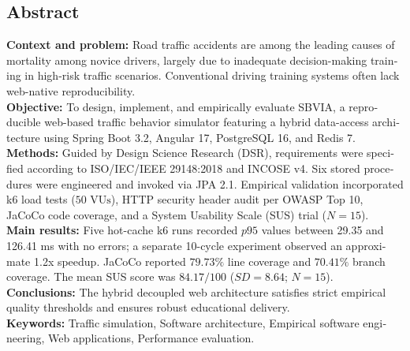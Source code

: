 \documentclass[11pt,a4paper]{report}
\begin{document}
\vspace{1cm}
\begin{otherlanguage}{english}
\chapter*{Abstract}
\textbf{Context and problem:} Road traffic accidents are among the leading causes of mortality among novice drivers, largely due to inadequate decision-making training in high-risk traffic scenarios. Conventional driving training systems often lack web-native reproducibility. \\
\textbf{Objective:} To design, implement, and empirically evaluate SBVIA, a reproducible web-based traffic behavior simulator featuring a hybrid data-access architecture using Spring Boot 3.2, Angular 17, PostgreSQL 16, and Redis 7. \\
\textbf{Methods:} Guided by Design Science Research (DSR), requirements were specified according to ISO/IEC/IEEE 29148:2018 and INCOSE v4. Six stored procedures were engineered and invoked via JPA 2.1. Empirical validation incorporated k6 load tests ($50\text{ VUs}$), HTTP security header audit per OWASP Top 10, JaCoCo code coverage, and a System Usability Scale (SUS) trial ($N=15$). \\
\textbf{Main results:} Five hot-cache k6 runs recorded $p95$ values between 29.35 and 126.41 ms with no errors; a separate 10-cycle experiment observed an approximate 1.2x speedup. JaCoCo reported $79.73\%$ line coverage and $70.41\%$ branch coverage. The mean SUS score was $84.17/100$ ($SD=8.64$; $N=15$). \\
\textbf{Conclusions:} The hybrid decoupled web architecture satisfies strict empirical quality thresholds and ensures robust educational delivery. \\
\textbf{Keywords:} Traffic simulation, Software architecture, Empirical software engineering, Web applications, Performance evaluation.
\end{otherlanguage}

\tableofcontents
\listoffigures
\listoftables
\lstlistoflistings
\end{document}
